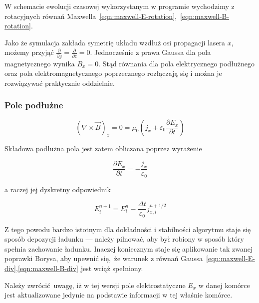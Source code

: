 
W schemacie ewolucji czasowej wykorzystanym w programie wychodzimy z rotacyjnych równań Maxwella~\ref{eqn:maxwell-E-rotation},~\ref{eqn:maxwell-B-rotation}.

Jako że symulacja zakłada symetrię układu wzdłuż osi propagacji lasera $x$,
możemy przyjąć $\frac{\partial}{\partial y} = \frac{\partial}{\partial z} =
0 $.  Jednocześnie z prawa Gaussa dla pola magnetycznego wynika $B_x = 0$.
Stąd równania dla pola elektrycznego podłużnego oraz pola
elektromagnetycznego poprzecznego rozłączają się i można je rozwiązywać praktycznie oddzielnie.

\subsubsection{Pole podłużne}

\begin{equation}
    \left(\nabla \times \vec{B}\right)_x = 0 = \mu_0 \left(j_x + \varepsilon_0 \frac{\partial E_x}{\partial t}\right)
    \label{eqn:longitudinal-field-eq}
 \end{equation}

Składowa podłużna pola jest zatem obliczana poprzez wyrażenie

\begin{equation}
\frac{\partial E_x}{\partial t} = - \frac{j_x}{\varepsilon_0}
\label{longitudinal-field-differential}
\end{equation}

a raczej jej dyskretny odpowiednik

\begin{equation}
    E_i^{n+1} = E_i^n - \frac{\Delta t}{\varepsilon_0} j_{x,i}^{n+1/2}
\label{longitudinal-field-finite-differential}
\end{equation}


Z tego powodu bardzo istotnym dla dokładności i stabilności algorytmu staje
się sposób depozycji ładunku --- należy pilnować, aby był robiony w sposób
który spełnia zachowanie ładunku. Inaczej koniecznym staje się aplikowanie
tak zwanej poprawki Borysa, 
aby upewnić się, że warunek z równań Gaussa~\ref{eqn:maxwell-E-div},\ref{eqn:maxwell-B-div}
jest wciąż spełniony.

Należy zwrócić uwagę, iż w tej wersji pole elektrostatyczne $E_x$ w danej komórce jest
aktualizowane jedynie na podstawie informacji w tej właśnie komórce.

